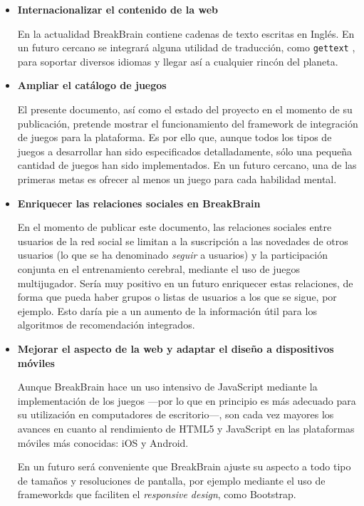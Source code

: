 \begin{itemize}

\item {\bf Internacionalizar el contenido de la web}

En la actualidad BreakBrain contiene cadenas de texto escritas en Inglés. En un futuro cercano se integrará alguna utilidad de traducción, como {\tt gettext} \cite{gettext}, para soportar diversos idiomas y llegar así a cualquier rincón del planeta.

\item {\bf Ampliar el catálogo de juegos}

El presente documento, así como el estado del proyecto en el momento de su publicación, pretende mostrar el funcionamiento del framework de integración de juegos para la plataforma. Es por ello que, aunque todos los tipos de juegos a desarrollar han sido especificados detalladamente, sólo una pequeña cantidad de juegos han sido implementados. En un futuro cercano, una de las primeras metas es ofrecer al menos un juego para cada habilidad mental.

\item {\bf Enriquecer las relaciones sociales en BreakBrain}

En el momento de publicar este documento, las relaciones sociales entre usuarios de la red social se limitan a la suscripción a las novedades de otros usuarios (lo que se ha denominado {\it seguir} a usuarios) y la participación conjunta en el entrenamiento cerebral, mediante el uso de juegos multijugador. Sería muy positivo en un futuro enriquecer estas relaciones, de forma que pueda haber grupos o listas de usuarios a los que se sigue, por ejemplo. Esto daría pie a un aumento de la información útil para los algoritmos de recomendación integrados.

\item {\bf Mejorar el aspecto de la web y adaptar el diseño a dispositivos móviles}

Aunque BreakBrain hace un uso intensivo de JavaScript mediante la implementación de los juegos ---por lo que en principio es más adecuado para su utilización en computadores de escritorio---, son cada vez mayores los avances en cuanto al rendimiento de HTML5 y JavaScript en las plataformas móviles más conocidas: iOS y Android.

En un futuro será conveniente que BreakBrain ajuste su aspecto a todo tipo de tamaños y resoluciones de pantalla, por ejemplo mediante el uso de frameworkds que faciliten el {\it responsive design}, como Bootstrap.


\end{itemize}
